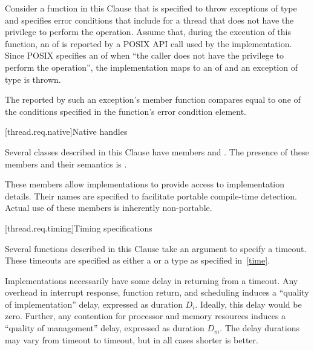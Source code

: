 \begin{example}
Consider a function in this Clause that is specified to throw exceptions of type
 and specifies error conditions that include
 for a thread that does not have the privilege to
perform the operation. Assume that, during the execution of this function, an 
of  is reported by a POSIX API call used by the implementation. Since POSIX
specifies an  of  when ``the caller does not have the privilege
to perform the operation'', the implementation maps  to an
 of  and an exception
of type  is thrown.
\end{example}

\pnum
The  reported by such an exception's  member function
compares equal to one of the conditions specified in the function's error condition
element.

[thread.req.native]{Native handles}

\pnum
Several classes described in this Clause have members  and
. The presence of these members and their semantics is
.
\begin{note}
These members allow implementations to provide access
to implementation details. Their names are specified to facilitate portable compile-time
detection. Actual use of these members is inherently non-portable.
\end{note}

[thread.req.timing]{Timing specifications}

\pnum
Several functions described in this Clause take an argument to specify a timeout. These
timeouts are specified as either a  or a  type as
specified in~\ref{time}.

\pnum
Implementations necessarily have some delay in returning from a timeout. Any overhead in
interrupt response, function return, and scheduling induces a ``quality of implementation''
delay, expressed as duration $D_i$. Ideally, this delay would be zero. Further, any contention for
processor and memory resources induces a ``quality of management'' delay, expressed as duration
$D_m$. The delay durations may vary from timeout to timeout, but in all cases shorter is better.


